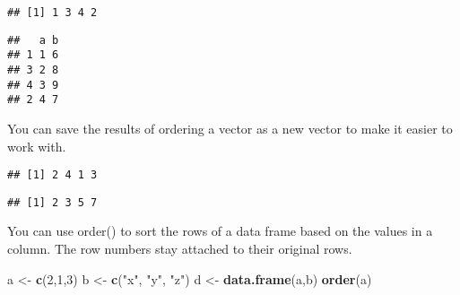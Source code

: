 \documentclass[
]{article}
\newenvironment{Shaded}{\begin{snugshade}}{\end{snugshade}}
\newcommand{\DataTypeTok}[1]{\textcolor[rgb]{0.13,0.29,0.53}{#1}}
\newcommand{\DecValTok}[1]{\textcolor[rgb]{0.00,0.00,0.81}{#1}}
\newcommand{\KeywordTok}[1]{\textcolor[rgb]{0.13,0.29,0.53}{\textbf{#1}}}
\newcommand{\NormalTok}[1]{#1}
\newcommand{\OperatorTok}[1]{\textcolor[rgb]{0.81,0.36,0.00}{\textbf{#1}}}
\newcommand{\StringTok}[1]{\textcolor[rgb]{0.31,0.60,0.02}{#1}}
\begin{document}
\begin{verbatim}
## [1] 1 3 4 2
\end{verbatim}

\begin{Shaded}
\end{Shaded}

\begin{verbatim}
##   a b
## 1 1 6
## 3 2 8
## 4 3 9
## 2 4 7
\end{verbatim}

You can save the results of ordering a vector as a new vector to make it
easier to work with.

\begin{Shaded}
\end{Shaded}

\begin{verbatim}
## [1] 2 4 1 3
\end{verbatim}

\begin{Shaded}
\end{Shaded}

\begin{verbatim}
## [1] 2 3 5 7
\end{verbatim}

You can use order() to sort the rows of a data frame based on the values
in a column. The row numbers stay attached to their original rows.

\begin{Shaded}
\begin{Highlighting}[]
\NormalTok{a <-}\StringTok{ }\KeywordTok{c}\NormalTok{(}\DecValTok{2}\NormalTok{,}\DecValTok{1}\NormalTok{,}\DecValTok{3}\NormalTok{)}
\NormalTok{b <-}\StringTok{ }\KeywordTok{c}\NormalTok{(}\StringTok{"x"}\NormalTok{, }\StringTok{"y"}\NormalTok{, }\StringTok{"z"}\NormalTok{)}
\NormalTok{d <-}\StringTok{ }\KeywordTok{data.frame}\NormalTok{(a,b)}
\KeywordTok{order}\NormalTok{(a)}
\end{Highlighting}
\end{Shaded}
\end{document}
